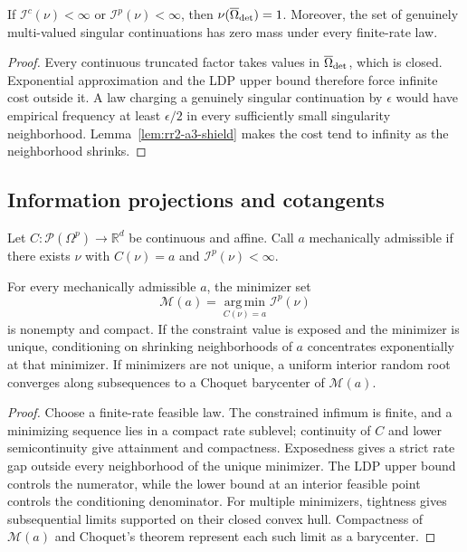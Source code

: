 \begin{proposition}
\label{prop:rr2-a3-support}
If \(\mathcal I^c(\nu)<\infty\) or \(\mathcal I^p(\nu)<\infty\), then
\(\nu(\overline\Omega_{\rm det})=1\).  Moreover, the set of genuinely
multi-valued singular continuations has zero mass under every finite-rate
law.
\end{proposition}

\begin{proof}
Every continuous truncated factor takes values in
\(\overline\Omega_{\rm det}\), which is closed.  Exponential approximation
and the LDP upper bound therefore force infinite cost outside it.  A law
charging a genuinely singular continuation by \(\epsilon\) would have
empirical frequency at least \(\epsilon/2\) in every sufficiently small
singularity neighborhood.  Lemma~\ref{lem:rr2-a3-shield} makes the cost tend
to infinity as the neighborhood shrinks.
\end{proof}

\subsection{Information projections and cotangents}

Let \(C:\mathcal P(\Omega^p)\to\mathbb R^d\) be continuous and affine.  Call
\(a\) mechanically admissible if there exists \(\nu\) with
\(C(\nu)=a\) and \(\mathcal I^p(\nu)<\infty\).

\begin{theorem}
\label{thm:rr2-a3-iproj}
For every mechanically admissible \(a\), the minimizer set
\[
 \mathcal M(a)=\operatorname*{arg\,min}_{C(\nu)=a}\mathcal I^p(\nu)
\]
is nonempty and compact.  If the constraint value is exposed and the
minimizer is unique, conditioning on shrinking neighborhoods of \(a\)
concentrates exponentially at that minimizer.  If minimizers are not unique,
a uniform interior random root converges along subsequences to a Choquet
barycenter of \(\mathcal M(a)\).
\end{theorem}

\begin{proof}
Choose a finite-rate feasible law.  The constrained infimum is finite, and
a minimizing sequence lies in a compact rate sublevel; continuity of \(C\)
and lower semicontinuity give attainment and compactness.  Exposedness gives
a strict rate gap outside every neighborhood of the unique minimizer.
The LDP upper bound controls the numerator, while the lower bound at an
interior feasible point controls the conditioning denominator.  For multiple
minimizers, tightness gives subsequential limits supported on their closed
convex hull.  Compactness of \(\mathcal M(a)\) and Choquet's theorem represent
each such limit as a barycenter.
\end{proof}

